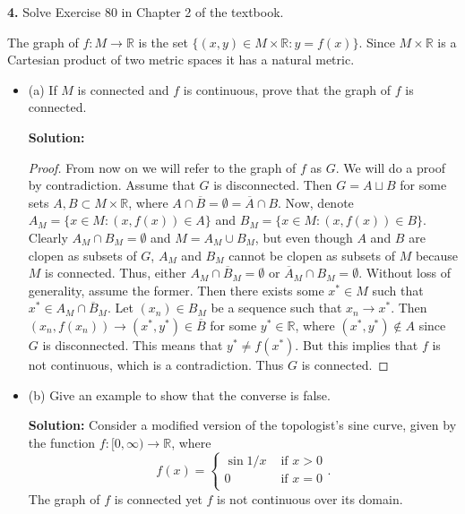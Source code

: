 \documentclass[11pt]{article}
\begin{document}
{\bf 4.} Solve Exercise 80 in Chapter 2 of the textbook.

The graph of $f: M \rightarrow \mathbb{R}$ is the set $\{(x,y) \in M\times
  \mathbb{R} : y  = f(x) \}$. Since $M\times \mathbb{R}$ is a Cartesian product
  of two metric spaces it has a natural metric.
\begin{itemize}[label={},leftmargin=4mm, itemsep=1em, parsep=1em]
  \item (a) If $M$ is connected and $f$ is continuous, prove that the graph of
    $f$ is connected.

  {\bf Solution:} 
  \begin{proof}
    From now on we will refer to the graph of $f$ as $G$. 
    We will do a proof by contradiction. Assume that $G$ is disconnected. Then
    $G = A \sqcup B$ for some sets $A, B \subset M\times \mathbb{R}$, 
    where $A \cap \overline{B} = \emptyset = \overline{A} \cap B$. Now,
    denote $A_{M} = \{ x \in M : (x, f(x)) \in A\}$ and $B_{M} = \{x \in M :
    (x,f(x)) \in B\}$. Clearly $A_{M}\cap B_{M} = \emptyset$ and $M = A_{M}\cup
    B_{M}$, but even though $A$ and $B$ are clopen as subsets of $G$, $A_{M}$
    and $B_{M}$ cannot be clopen as subsets of $M$ because $M$ is connected. Thus,
    either $A_{M} \cap \overline{B}_{M} = \emptyset$ or $\overline{A}_{M}\cap
    B_{M} = \emptyset$. Without loss of generality, assume the former. Then
    there exists some $x^{*} \in M$ such that $x^{*} \in A_{M}\cap \overline{B}_{M}$. Let
    $(x_{n}) \in B_{M}$ be a sequence such that $x_{n}\rightarrow x^{*}$. Then
    $(x_{n}, f(x_{n})) \rightarrow (x^{*}, y^{*})\in \overline{B}$ for some $y^{*}\in
    \mathbb{R}$, where $(x^{*}, y^{*}) \notin A$ since $G$ is disconnected. This
    means that $y^{*} \neq f(x^{*})$. But this implies that $f$ is not
    continuous, which is a contradiction. Thus $G$ is connected.
  \end{proof}

  \item (b) Give an example to show that the converse is false.

  {\bf Solution:} Consider a modified version of the topologist's sine curve,
  given by the function $f : [0,\infty) \rightarrow \mathbb{R}$, where 
  \[ f(x) = \left\{ \begin{array}{cl}
      \sin 1 / x & \text{ if } x > 0 \\
      0 & \text{ if } x = 0 \\
  \end{array}. \right. \]
  The graph of $f$ is connected yet $f$ is not continuous over its domain.


\end{itemize}
\end{document}
